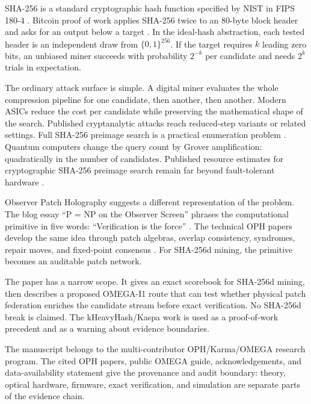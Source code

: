 \documentclass[11pt]{article}
\theoremstyle{definition}
\theoremstyle{remark}
\newcommand{\bits}{\{0,1\}}
\begin{document}
SHA-256 is a standard cryptographic hash function specified by NIST in FIPS
180-4 \cite{NISTFIPS1804}. Bitcoin proof of work applies SHA-256 twice to an
80-byte block header and asks for an output below a target \cite{Nakamoto2008}.
In the ideal-hash abstraction, each tested header is an independent draw from
\(\bits^{256}\). If the target requires \(k\) leading zero bits, an unbiased
miner succeeds with probability \(2^{-k}\) per candidate and needs \(2^k\)
trials in expectation.

The ordinary attack surface is simple. A digital miner evaluates the whole
compression pipeline for one candidate, then another, then another. Modern
ASICs reduce the cost per candidate while preserving the mathematical shape of
the search. Published cryptanalytic attacks reach reduced-step variants or related
settings. Full SHA-256 preimage search is a practical enumeration problem
\cite{MendelNadSchlaeffer2013,KhovratovichRechbergerSavelieva2011,AlamgirNejatiBright2024}.
Quantum computers change the query count by Grover amplification: quadratically
in the number of candidates. Published resource estimates for
cryptographic SHA-256 preimage search remain far beyond fault-tolerant
hardware \cite{Grover1997,Zalka1999,AmyEtAl2016,NeremGaur2023}.

Observer Patch Holography suggests a different representation of the problem.
The blog essay ``P = NP on the Observer Screen'' phrases the computational
primitive in five words: ``Verification is the force'' \cite{OPHBlogPNP}. The
technical OPH papers develop the same idea through patch algebras, overlap
consistency, syndromes, repair moves, and fixed-point consensus
\cite{OPHObserversCurrent,OPHCompactCurrent,OPHConsensusCurrent,OPHScreenCurrent}. For SHA-256d mining, the
primitive becomes an auditable patch network.

The paper has a narrow scope. It gives an exact scorebook for SHA-256d mining,
then describes a proposed OMEGA-I1 route that can test whether physical patch
federation enriches the candidate stream before exact verification. No SHA-256d
break is claimed. The kHeavyHash/Kaspa work is used as a proof-of-work
precedent and as a warning about evidence boundaries.

The manuscript belongs to the multi-contributor OPH/Karma/OMEGA research
program. The cited OPH papers, public OMEGA guide, acknowledgements, and
data-availability statement give the provenance and audit boundary: theory,
optical hardware, firmware, exact verification, and simulation are separate
parts of the evidence chain.
\end{document}
